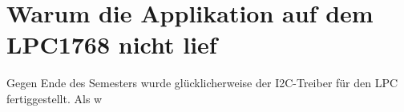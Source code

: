 \documentclass[12pt,a4paper]{article}
\author{Jonathan Weißenberger}
\begin{document}
\section{Warum die Applikation auf dem LPC1768 nicht lief}
Gegen Ende des Semesters wurde glücklicherweise der I2C-Treiber für den LPC fertiggestellt. Als w
\end{document}
